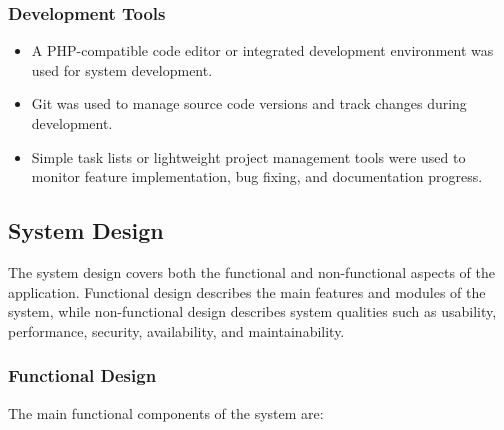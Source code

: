 \subsubsection*{Development Tools}

\begin{itemize}
    \item A PHP-compatible code editor or integrated development environment was used for system development.
    
    \item Git was used to manage source code versions and track changes during development.
    
    \item Simple task lists or lightweight project management tools were used to monitor feature implementation, bug fixing, and documentation progress.
\end{itemize}

\subsection{System Design}

The system design covers both the functional and non-functional aspects of the application. Functional design describes the main features and modules of the system, while non-functional design describes system qualities such as usability, performance, security, availability, and maintainability.

\subsubsection*{Functional Design}

The main functional components of the system are:

